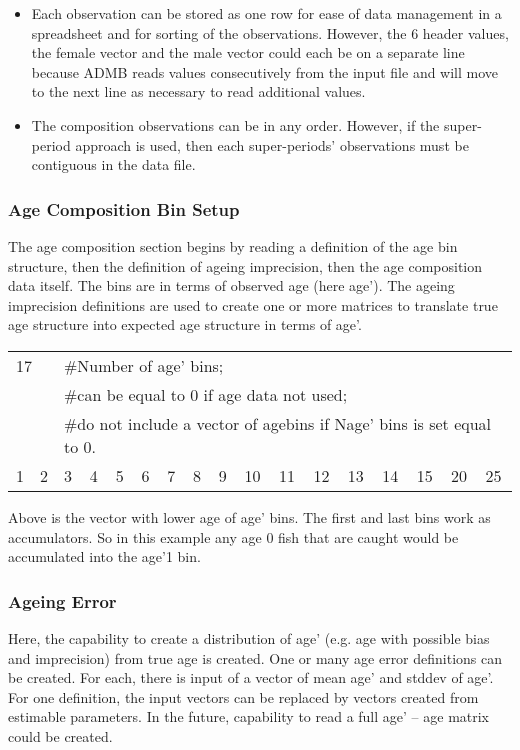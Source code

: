 \begin{description}
\begin{itemize}
		\item Each observation can be stored as one row for ease of data management in a spreadsheet and for sorting of the observations.  However, the 6 header values, the female vector and the male vector could each be on a separate line because ADMB reads values consecutively from the input file and will move to the next line as necessary to read additional values.
		\item The composition observations can be in any order.  However, if the super-period approach is used, then each super-periods’ observations must be contiguous in the data file.
	\end{itemize}
\end{description}

\subsubsection{Age Composition Bin Setup}
The age composition section begins by reading a definition of the age bin structure, then the definition of ageing imprecision, then the age composition data itself.  The bins are in terms of observed age (here age’).  The ageing imprecision definitions are used to create one or more matrices to translate true age structure into expected age structure in terms of age’.

\begin{center}
	\begin{tabular}{p{.5cm} p{.5cm} p{.5cm} p{.5cm} p{.5cm} p{.5cm} p{.5cm} p{.5cm} p{.5cm} p{.5cm} p{.5cm} p{.5cm} p{.5cm} p{.5cm} p{.5cm} p{.5cm} p{.5cm}}
		\hline
		\multicolumn{2}{l}{17} & \multicolumn{15}{l}{\#Number of age' bins;} \\
		\multicolumn{2}{l}{}   & \multicolumn{15}{l}{\#can be equal to 0 if age data not used;}\\
		\multicolumn{2}{l}{}   & \multicolumn{15}{l}{\#do not include a vector of agebins if Nage' bins is set equal to 0.}\\
		\hline
		1 & 2 & 3 & 4 & 5 & 6 & 7 & 8 & 9 & 10 & 11 & 12 & 13 & 14 & 15 & 20 & 25 \\
		\hline		
	\end{tabular}
\end{center}
Above is the vector with lower age of age' bins.  The first and last bins work as accumulators.  So in this example any age 0 fish that are caught would be accumulated into the age’1 bin.

\subsubsection{Ageing Error}
Here, the capability to create a distribution of age’ (e.g. age with possible bias and imprecision) from true age is created.  One or many age error definitions can be created.  For each, there is input of a vector of mean age’ and stddev of age’.  For one definition, the input vectors can be replaced by vectors created from estimable parameters.  In the future, capability to read a full age’ – age matrix could be created.

